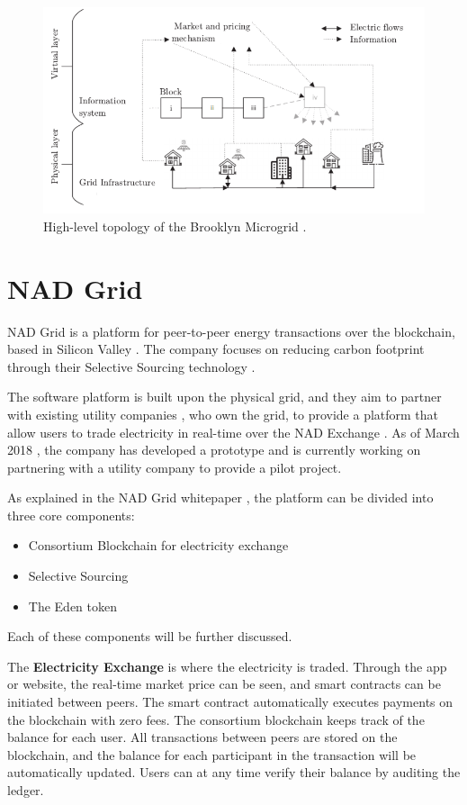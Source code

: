 \begin{figure}[htb]
    \centering
    \includegraphics[width=1\textwidth]{Images/bm}
    \caption{High-level topology of the Brooklyn Microgrid \cite{Brooklyn_Mengelkamp}.}
    \label{fig:bm}
\end{figure}
 

\section{NAD Grid}
NAD Grid is a platform for peer-to-peer energy transactions over the blockchain, based in Silicon Valley \cite{nad_youtube}. The company focuses on reducing carbon footprint through their Selective Sourcing technology \cite{nad}.

The software platform is built upon the physical grid, and they aim to partner with existing utility companies \cite{nad_youtube}, who own the grid, to provide a platform that allow users to trade electricity in real-time over the NAD Exchange \cite{nad}. As of March 2018 \cite{nad_youtube}, the company has developed a prototype and is currently working on partnering with a utility company to provide a pilot project.

As explained in the NAD Grid whitepaper \cite{nadgrid}, the platform can be divided into three core components: 
\begin{itemize}
\item Consortium Blockchain for electricity exchange
\item Selective Sourcing
\item The Eden token
\end{itemize}
Each of these components will be further discussed. 

The \textbf{Electricity Exchange} is where the electricity is traded. Through the app or website, the real-time market price can be seen, and smart contracts can be initiated between peers. The smart contract automatically executes payments on the blockchain with zero fees. The consortium blockchain keeps track of the  balance for each user. All transactions between peers are stored on the blockchain, and the balance for each participant in the transaction will be automatically updated. Users can at any time verify their balance by auditing the ledger.

